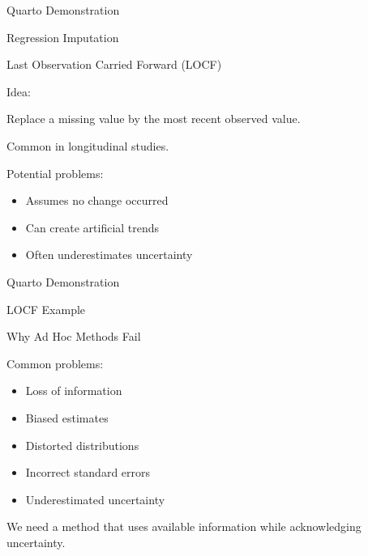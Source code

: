 \documentclass{beamer}
\begin{document}
\begin{frame}[plain]
\centering
\vfill
{\Huge Quarto Demonstration}

\vspace{0.5cm}

{\Large Regression Imputation}

\vfill
\end{frame}

\begin{frame}{Last Observation Carried Forward (LOCF)}

Idea:

Replace a missing value by the most recent observed value.

\vspace{0.3cm}

Common in longitudinal studies.

\vspace{0.3cm}

Potential problems:

\begin{itemize}
\item Assumes no change occurred
\item Can create artificial trends
\item Often underestimates uncertainty
\end{itemize}
\end{frame}

\begin{frame}[plain]
\centering
\vfill
{\Huge Quarto Demonstration}

\vspace{0.5cm}

{\Large LOCF Example}

\vfill
\end{frame}

\begin{frame}{Why Ad Hoc Methods Fail}

Common problems:

\begin{itemize}
\item Loss of information
\item Biased estimates
\item Distorted distributions
\item Incorrect standard errors
\item Underestimated uncertainty
\end{itemize}

\vspace{0.5cm}

We need a method that uses available information while acknowledging uncertainty.
\end{frame}
\end{document}
